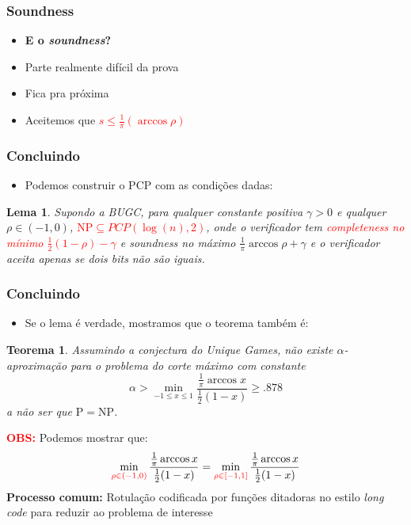 \documentclass[11pt, handout]{beamer}
\newcommand{\red}[1]{\textcolor{red}{#1}}
\newcommand{\pp}{\ensuremath{\mathrm{P}}\xspace}
\newcommand{\np}{\ensuremath{\mathrm{NP}}\xspace}
\newtheorem{teorema}{Teorema}
\newtheorem{lema}{Lema}
\begin{document}
\begin{frame}[<+->]
\frametitle{Soundness}
    \begin{itemize}
    \item \textbf{E o \textit{soundness}?} 
    \item Parte realmente difícil da prova
    \item Fica pra próxima
    \item Aceitemos que \red{$s \leq \frac{1}{\pi}(\arccos{\rho})$}
    \end{itemize}
\end{frame}{}

\begin{frame}[<+->]
\frametitle{Concluindo}
    \begin{itemize}
        \item Podemos construir o PCP com as condições dadas:
    \end{itemize}
    \begin{lema}
        Supondo a BUGC, para qualquer constante positiva $\gamma>0$ e qualquer $\rho \in (-1,0)$, \textcolor{red}{$\np \subseteq PCP(\log (n),2)$}, onde o verificador tem \red{\textit{completeness} no mínimo $\frac{1}{2} (1-\rho)-\gamma$} e \textit{soundness} no máximo $\frac{1}{\pi} \arccos{\rho} + \gamma$ e o verificador aceita apenas se dois bits não são iguais.
    \end{lema}
\end{frame}{}

\begin{frame}[<+->]
\frametitle{Concluindo}
    \begin{itemize}
        \item Se o lema é verdade, mostramos que o teorema também é:
    \end{itemize}
    \begin{teorema}
        Assumindo a conjectura do Unique Games, não existe $\alpha$-aproximação para o problema do corte máximo com constante
        \[\alpha > \min_{-1 \le x \le 1} \frac{\frac{1}{\pi} \arccos{x}}{\frac{1}{2}(1-x)} \ge .878 \]
        a não ser que $\pp = \np$.
    \end{teorema}
    \red{\textbf{OBS:}} Podemos mostrar que: \[ \min_{\red{\rho\in(-1, 0)}} \frac{\frac{1}{\pi} \arccos{x}}{\frac{1}{2}(1-x)} = \min_{\red{\rho\in[-1, 1]}} \frac{\frac{1}{\pi} \arccos{x}}{\frac{1}{2}(1-x)} \]
    \textbf{Processo comum:} Rotulação codificada por funções ditadoras no estilo \textit{long code} para reduzir ao problema de interesse
\end{frame}{}
\end{document}
